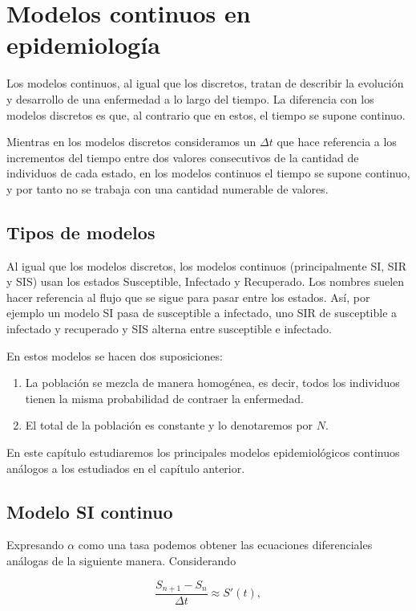 \chapter{Modelos continuos en epidemiología}

Los modelos continuos, al igual que los discretos, tratan de describir la evolución y desarrollo de una enfermedad a lo largo del tiempo. La diferencia con los modelos discretos es que, al contrario que en estos, el tiempo se supone continuo.

Mientras en los modelos discretos consideramos un $\Delta t$ que hace referencia a los incrementos del tiempo entre dos valores consecutivos de la cantidad de individuos de cada estado, en los modelos continuos el tiempo se supone continuo, y por tanto no se trabaja con una cantidad numerable de valores.

\section{Tipos de modelos}

Al igual que los modelos discretos, los modelos continuos (principalmente SI, SIR y SIS) usan los estados Susceptible, Infectado y Recuperado. Los nombres suelen hacer referencia al flujo que se sigue para pasar entre los estados. Así, por ejemplo un modelo SI pasa de susceptible a infectado, uno SIR de susceptible a infectado y recuperado y SIS alterna entre susceptible e infectado.

En estos modelos se hacen dos suposiciones:
\begin{enumerate}
\item La población se mezcla de manera homogénea, es decir, todos los individuos tienen la misma probabilidad de contraer la enfermedad.
\item El total de la población es constante y lo denotaremos por $N$.
\end{enumerate}

En este capítulo estudiaremos los principales modelos epidemiológicos continuos análogos a los estudiados en el capítulo anterior.


\section{Modelo SI continuo}

Expresando $\alpha$ como una tasa podemos obtener las ecuaciones diferenciales análogas de la siguiente manera. Considerando

$$\frac{S_{n+1} - S_n}{\Delta t} \approx S'(t),$$

